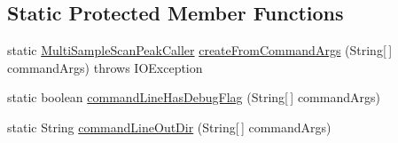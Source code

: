 \subsection*{Static Protected Member Functions}
\begin{DoxyCompactItemize}
\item 
static \hyperlink{classbroad_1_1pda_1_1seq_1_1protection_1_1_multi_sample_scan_peak_caller}{Multi\+Sample\+Scan\+Peak\+Caller} \hyperlink{classbroad_1_1pda_1_1seq_1_1protection_1_1_multi_sample_scan_peak_caller_ade2431eade4f45e77e73e36236cdc81e}{create\+From\+Command\+Args} (String\mbox{[}$\,$\mbox{]} command\+Args)  throws I\+O\+Exception 
\item 
static boolean \hyperlink{classbroad_1_1pda_1_1seq_1_1protection_1_1_multi_sample_scan_peak_caller_a81cf63b0b2d082a3ee577570365edb68}{command\+Line\+Has\+Debug\+Flag} (String\mbox{[}$\,$\mbox{]} command\+Args)
\item 
static String \hyperlink{classbroad_1_1pda_1_1seq_1_1protection_1_1_multi_sample_scan_peak_caller_ad720ec027b5514deff88752afab91036}{command\+Line\+Out\+Dir} (String\mbox{[}$\,$\mbox{]} command\+Args)
\end{DoxyCompactItemize}
